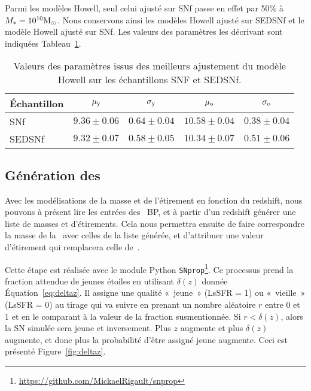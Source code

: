 \documentclass[../main/main.tex]{subfiles}
\begin{document}
Parmi les modèles Howell, seul celui ajusté sur SNf passe en effet par 50\% à
$M_*=10^{10}\si{\Msun}$. Nous conservons ainsi les modèles Howell ajusté sur
SEDSNf et le modèle Howell ajusté sur SNf. Les valeurs des paramètres les
décrivant sont indiquées Tableau~\ref{tab:modelresults}.

\begin{table}[ht]
    \centerfloat
    \caption[Valeurs des paramètres issus des meilleurs ajustement du modèle
    Howell sur les échantillons SNF et SEDSNf]{Valeurs des paramètres issus des
    meilleurs ajustement du modèle Howell sur les échantillons SNF et SEDSNf.}
    \label{tab:modelresults}
    \begin{tabular}{lcccc}
        \toprule
        Échantillon              &
                $\mu_{\rm y} $   &
                $\sigma_{\rm y}$ &
                $\mu_{\rm o} $   &
                $\sigma_{\rm o}$ \\
        \midrule
        SNf    & $9.36  \pm 0.06$
               & $0.64  \pm 0.04$
               & $10.58 \pm 0.04$
               & $0.38  \pm 0.04$
               \\
        SEDSNf & $9.32  \pm 0.07$
               & $0.58  \pm 0.05$
               & $10.34 \pm 0.07$
               & $0.51  \pm 0.06$
               \\
        \bottomrule
    \end{tabular}
\end{table}

\subsection{Génération des \hostlib}\label{ssec:inpgen}

Avec les modélisations de la masse et de l'étirement en fonction du redshift,
nous pouvons à présent lire les entrées des \hostlib\ BP, et à partir d'un
redshift générer une liste de masses et d'étirements. Cela nous permettra
ensuite de faire correspondre la masse de la \hostlib\ avec celles de la liste
générée, et d'attribuer une valeur d'étirement qui remplacera celle
de~.

Cette étape est réalisée avec le module Python
\texttt{SNprop}\footnote{\label{fn:snprop}\href{
    https://github.com/MickaelRigault/snprop}
{https://github.com/MickaelRigault/snprop}}. Ce processus prend la fraction
attendue de jeunes étoiles en utilisant $\delta(z)$ donnée
Équation~\ref{eq:deltaz}. Il assigne une qualité «~jeune~» (LsSFR = 1) ou
«~vieille~» (LsSFR = 0) au tirage qui va suivre en prenant un nombre aléatoire
$r$ entre 0 et 1 et en le comparant à la valeur de la fraction susmentionnée. Si
$r < \delta(z)$, alors la SN simulée sera jeune et inversement. Plus $z$
augmente et plus $\delta(z)$ augmente, et donc plus la probabilité d'être
assigné jeune augmente. Ceci est présenté Figure~\ref{fig:deltaz}.
\end{document}
